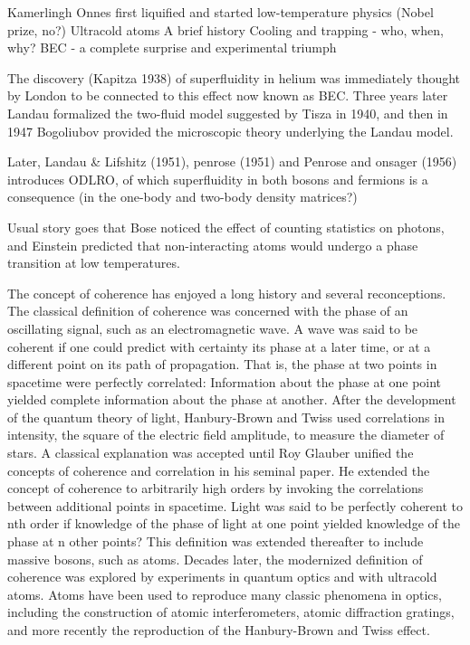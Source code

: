 	Kamerlingh Onnes first liquified and started low-temperature physics (Nobel prize, no?)
	Ultracold atoms A brief history Cooling and trapping - who, when, why?
	BEC - a complete surprise and experimental triumph

	The discovery (Kapitza 1938) of superfluidity in helium was immediately thought by London to be connected to this effect now known as BEC.
	Three years later Landau formalized the two-fluid model suggested by Tisza in 1940, and then in 1947 Bogoliubov provided the microscopic theory underlying the Landau model.

	Later, Landau \& Lifshitz (1951), penrose (1951) and Penrose and onsager (1956) introduces ODLRO, of which superfluidity in both bosons and fermions is a consequence (in the one-body and two-body density matrices?)

	Usual story goes that Bose noticed the effect of counting statistics on photons, and Einstein predicted that non-interacting atoms would undergo a phase transition at low temperatures.

	The concept of coherence has enjoyed a long history and several reconceptions.
	The classical definition of coherence was concerned with the phase of an oscillating signal, such as an electromagnetic wave.
	A wave was said to be coherent if one could predict with certainty its phase at a later time, or at a different point on its path of propagation.
	That is, the phase at two points in spacetime were perfectly correlated: Information about the phase at one point yielded complete information about the phase at another.
	After the development of the quantum theory of light, Hanbury-Brown and Twiss used correlations in intensity, the square of the electric field amplitude, to measure the diameter of stars.
	A classical explanation was accepted until Roy Glauber unified the concepts of coherence and correlation in his seminal paper.
	He extended the concept of coherence to arbitrarily high orders by invoking the correlations between additional points in spacetime.
	Light was said to be perfectly coherent to nth order if knowledge of the phase of light at one point yielded knowledge of the phase at n other points? This definition was extended thereafter to include massive bosons, such as atoms.
	Decades later, the modernized definition of coherence was explored by experiments in quantum optics and with ultracold atoms.
	Atoms have been used to reproduce many classic phenomena in optics, including the construction of atomic interferometers, atomic diffraction gratings, and more recently the reproduction of the Hanbury-Brown and Twiss effect.
	

